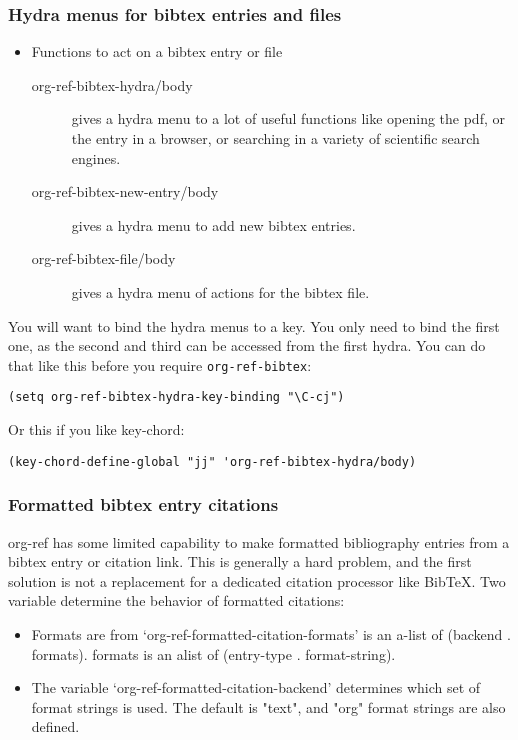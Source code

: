 \documentclass[11pt]{article}
\begin{document}
\subsubsection{Hydra menus for bibtex entries and files}
\label{sec:org14a9c65}

\begin{itemize}
\item Functions to act on a bibtex entry or file
\begin{description}
\item[{org-ref-bibtex-hydra/body}] gives a hydra menu to a lot of useful functions
like opening the pdf, or the entry in a browser, or searching in a
variety of scientific search engines.
\item[{org-ref-bibtex-new-entry/body}] gives a hydra menu to add new bibtex entries.
\item[{org-ref-bibtex-file/body}] gives a hydra menu of actions for the bibtex file.
\end{description}
\end{itemize}

You will want to bind the hydra menus to a key. You only need to bind the first one, as the second and third can be accessed from the first hydra. You can do that like this before you require \texttt{org-ref-bibtex}:

\begin{verbatim}
(setq org-ref-bibtex-hydra-key-binding "\C-cj")
\end{verbatim}

Or this if you like key-chord:

\begin{verbatim}
(key-chord-define-global "jj" 'org-ref-bibtex-hydra/body)
\end{verbatim}

\subsubsection{Formatted bibtex entry citations}
\label{sec:org1413664}

org-ref has some limited capability to make formatted bibliography entries from a bibtex entry or citation link. This is generally a hard problem, and the first solution is not a replacement for a dedicated citation processor like BibTeX. Two variable determine the behavior of formatted citations:

\begin{itemize}
\item Formats are from `org-ref-formatted-citation-formats' is an a-list of (backend . formats). formats is an alist of (entry-type . format-string).
\item The variable `org-ref-formatted-citation-backend' determines which set of format strings is used. The default is "text", and "org" format strings are also defined.
\end{itemize}
\end{document}
